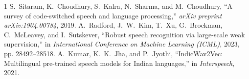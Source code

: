 \documentclass[10pt,journal,compsoc]{IEEEtran}
\begin{document}

\begin{thebibliography}{1}
S.~Sitaram, K.~Choudhury, S.~Kalra, N.~Sharma, and M.~Choudhury, ``A survey of code-switched speech and language processing,'' \emph{arXiv preprint arXiv:1904.00784}, 2019.
A.~Radford, J.~W.~Kim, T.~Xu, G.~Brockman, C.~McLeavey, and I.~Sutskever, ``Robust speech recognition via large-scale weak supervision,'' in \emph{International Conference on Machine Learning (ICML)}, 2023, pp. 28492--28518.
A.~Kumar, K.~K.~Jha, and P.~Jyothi, ``IndicWav2Vec: Multilingual pre-trained speech models for Indian languages,'' in \emph{Interspeech}, 2021.
\end{thebibliography}
\end{document}
